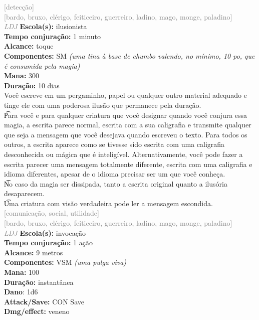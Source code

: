 \documentclass{RPG_Adventure}[2021/10/20]
\begin{document}
{\scriptsize \textcolor{gray}{[detecção]\\}}
{\scriptsize \textcolor{gray}{[bardo, bruxo, clérigo, feiticeiro, guerreiro, ladino, mago, monge, paladino]\\}}
{\tiny \textcolor{gray}{\textit{LDJ}}}
{\small \t \textbf{Escola(s):} ilusionista\\\t \textbf{Tempo conjuração:} 1 minuto\\\t \textbf{Alcance:} toque\\\t \textbf{Componentes:} SM \textit{(uma tina à base de chumbo valendo, no mínimo, 10 po, que é consumida pela magia)}\\\t \textbf{Mana:} 300\\\t \textbf{Duração:} 10 dias\\}
{\normalsize Você escreve em um pergaminho, papel ou qualquer outro material adequado e tinge ele com uma poderosa ilusão que permanece pela duração.\\\t Para você e para qualquer criatura que você designar quando você conjura essa magia, a escrita parece normal, escrita com a sua caligrafia e transmite qualquer que seja a mensagem que você desejava quando escreveu o texto. Para todos os outros, a escrita aparece como se tivesse sido escrita com uma caligrafia desconhecida ou mágica que é inteligível. Alternativamente, você pode fazer a escrita parecer uma mensagem totalmente diferente, escrita com uma caligrafia e idioma diferentes, apesar de o idioma precisar ser um que você conheça.\\\t No caso da magia ser dissipada, tanto a escrita original quanto a ilusória desaparecem.\\\t Uma criatura com visão verdadeira pode ler a mensagem escondida.\\}
{\scriptsize \textcolor{gray}{[comunicação, social, utilidade]\\}}
{\scriptsize \textcolor{gray}{[bardo, bruxo, clérigo, feiticeiro, guerreiro, ladino, mago, monge, paladino]\\}}
{\tiny \textcolor{gray}{\textit{LDJ}}}
{\small \t \textbf{Escola(s):} invocação\\\t \textbf{Tempo conjuração:} 1 ação\\\t \textbf{Alcance:} 9 metros\\\t \textbf{Componentes:} VSM \textit{(uma pulga viva)}\\\t \textbf{Mana:} 100\\\t \textbf{Duração:} instantânea\\\t \textbf{Dano}: 1d6\\\t \textbf{Attack/Save:} CON Save\\\t \textbf{Dmg/effect:} veneno\\}
\end{document}
